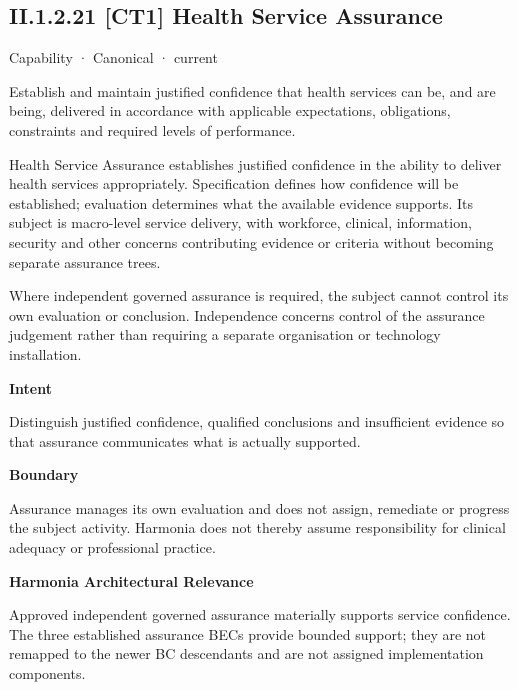 \subsection*{II.1.2.21 [CT1] Health Service Assurance}
\label{navigation:II.1.2.21}

\label{element:14860102964c441681d41ec3da423fe0}
{\small Capability · Canonical · current}\par

Establish and maintain justified confidence that health services can be, and are being, delivered in accordance with applicable expectations, obligations, constraints and required levels of performance.



Health Service Assurance establishes justified confidence in the ability to deliver health services appropriately. Specification defines how confidence will be established; evaluation determines what the available evidence supports. Its subject is macro-level service delivery, with workforce, clinical, information, security and other concerns contributing evidence or criteria without becoming separate assurance trees.



Where independent governed assurance is required, the subject cannot control its own evaluation or conclusion. Independence concerns control of the assurance judgement rather than requiring a separate organisation or technology installation.



\textbf{Intent}



Distinguish justified confidence, qualified conclusions and insufficient evidence so that assurance communicates what is actually supported.



\textbf{Boundary}



Assurance manages its own evaluation and does not assign, remediate or progress the subject activity. Harmonia does not thereby assume responsibility for clinical adequacy or professional practice.



\textbf{Harmonia Architectural Relevance}



Approved independent governed assurance materially supports service confidence. The three established assurance BECs provide bounded support; they are not remapped to the newer BC descendants and are not assigned implementation components.


